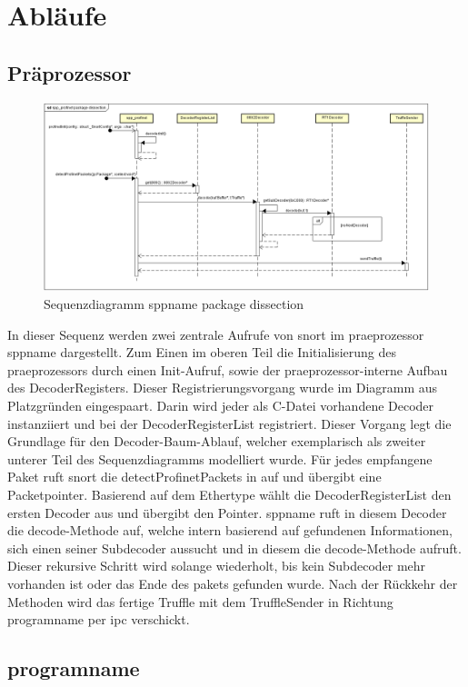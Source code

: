 \chapter{Abläufe}

\section{Präprozessor}
\begin{figure}[H]
  \centering
  \includegraphics[width=\textwidth]{../diagramimages/spp-profinet-package-dissection.png}
  \caption[Sequenzdiagramm \gls{sppname} package dissection]{Sequenzdiagramm \gls{sppname} package dissection}
\end{figure}

In dieser Sequenz werden zwei zentrale Aufrufe von \gls{snort} im \gls{praeprozessor} \gls{sppname} dargestellt. Zum Einen im oberen Teil die Initialisierung des \gls{praeprozessor}s durch einen Init-Aufruf, sowie der \gls{praeprozessor}-interne Aufbau des DecoderRegisters. Dieser Registrierungsvorgang wurde im Diagramm aus Platzgründen eingespaart. Darin wird jeder als C-Datei vorhandene Decoder instanziiert und bei der DecoderRegisterList registriert. Dieser Vorgang legt die Grundlage für den Decoder-Baum-Ablauf, welcher exemplarisch als zweiter unterer Teil des Sequenzdiagramms modelliert wurde. Für jedes empfangene Paket ruft \gls{snort} die detectProfinetPackets in \sppname auf und übergibt eine Packetpointer. Basierend auf dem Ethertype wählt die DecoderRegisterList den ersten Decoder aus und übergibt den Pointer. \gls{sppname} ruft in diesem Decoder die decode-Methode auf, welche intern basierend auf gefundenen Informationen, sich einen seiner Subdecoder aussucht und in diesem die decode-Methode aufruft. Dieser rekursive Schritt wird solange wiederholt, bis kein Subdecoder mehr vorhanden ist oder das Ende des \gls{paket}s gefunden wurde.
Nach der Rückkehr der Methoden wird das fertige Truffle mit dem TruffleSender in Richtung \gls{programname} per \gls{ipc} verschickt.


\section{\gls{programname}}


